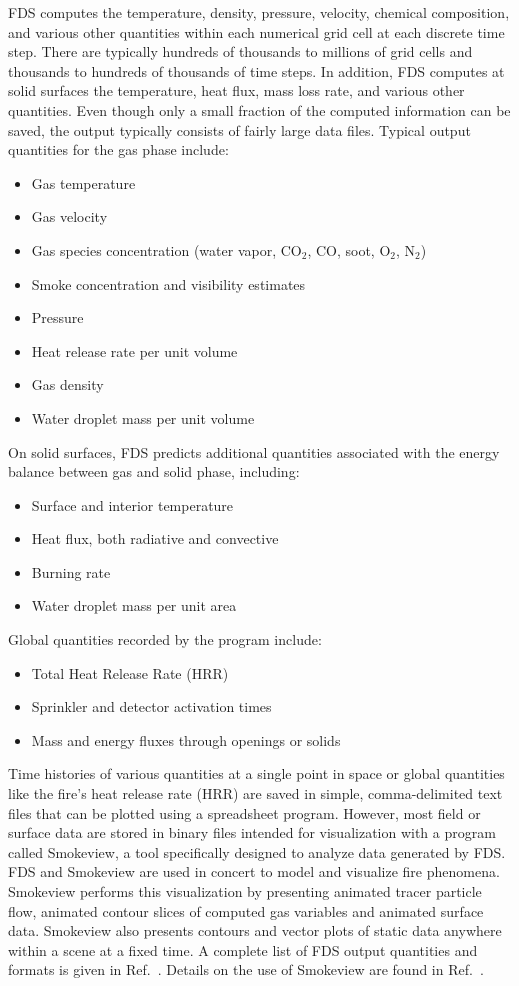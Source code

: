 \documentclass[11pt]{book}
\begin{document}
FDS computes the temperature, density, pressure, velocity, chemical composition, and various other quantities within each numerical grid cell at each discrete time step. There are typically hundreds of thousands to millions of grid cells and thousands to hundreds of thousands of time steps. In addition, FDS computes at solid surfaces the temperature, heat flux, mass loss rate, and various other quantities. Even though only a small fraction of the computed information can be saved, the output typically consists of fairly large data files. Typical output quantities for the gas phase include:
\begin{itemize}
\setlength{\itemsep}{0.0in}
\item Gas temperature
\item Gas velocity
\item Gas species concentration (water vapor, CO$_2$, CO, soot, O$_2$, N$_2$)
\item Smoke concentration and visibility estimates
\item Pressure
\item Heat release rate per unit volume
\item Gas density
\item Water droplet mass per unit volume
\end{itemize}
On solid surfaces, FDS predicts additional quantities associated with the energy balance between gas and solid phase, including:
\begin{itemize}
\setlength{\itemsep}{0.0in}
\item Surface and interior temperature
\item Heat flux, both radiative and convective
\item Burning rate
\item Water droplet mass per unit area
\end{itemize}
Global quantities recorded by the program include:
\begin{itemize}
\setlength{\itemsep}{0.0in}
\item Total Heat Release Rate (HRR)
\item Sprinkler and detector activation times
\item Mass and energy fluxes through openings or solids
\end{itemize}
Time histories of various quantities at a single point in space or global quantities like the fire's heat release rate (HRR) are saved in simple, comma-delimited text files that can be plotted using a spreadsheet program. However, most field or surface data are stored in binary files intended for visualization with a program called Smokeview, a tool specifically designed to analyze data generated by FDS. FDS and Smokeview are used in concert to model and visualize fire phenomena. Smokeview performs this visualization by presenting animated tracer particle flow, animated contour slices of computed gas variables and animated surface data. Smokeview also presents contours and vector plots of static data anywhere within a scene at a fixed time. A complete list of FDS output quantities and formats is given in Ref.~\cite{FDS_Users_Guide}. Details on the use of Smokeview are found in Ref.~\cite{Smokeview_Users_Guide}.
\end{document}
